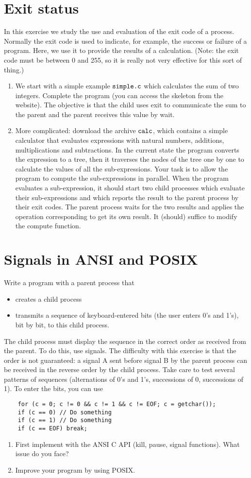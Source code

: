 \documentclass[11pt]{article}
\begin{document}
\bigskip


\section{Exit status}

In this exercise we study the use and evaluation of the exit code of a process. Normally the exit code is used to indicate, for example, the success or failure of a program. Here, we use it to provide the results of a calculation. (Note: the exit code must be between 0 and 255, so it is really not very effective for this sort of thing.)
\begin{enumerate}
	\item We start with a simple example $\verb|simple.c|$ which calculates the sum of two integers. Complete the program (you can access the skeleton from the website). The objective is that the child uses exit to communicate the sum to the parent and the parent receives this value by wait.
	
	\item More complicated: download the archive $\verb*|calc|$, which contains a simple calculator that evaluates expressions with natural numbers, additions, multiplications and subtractions. In the current state the program converts the expression to a tree, then it traverses the nodes of the tree one by one to calculate the values of all the sub-expressions. Your task is to allow the program to compute the sub-expressions in parallel. When the program evaluates a sub-expression, it should start two child processes which evaluate their sub-expressions and which reports the result to the parent process by their exit codes. The parent process waits for the two results and applies the operation corresponding to get its own result. It (should) suffice to modify the compute function.
\end{enumerate}


\section{Signals in ANSI and POSIX}
 Write a program with a parent process that \begin{itemize}
 	\item creates a child process
 	\item transmits a sequence of keyboard-entered bits (the user enters 0's and 1's), bit by bit, to this child process.
 \end{itemize}
The child process must display the sequence in the correct order as received from the parent. To do this, use signals. The difficulty with this exercise is that the order is not guaranteed: a signal A sent before signal B by the parent process can be received in the reverse order by the child process.
Take care to test several patterns of sequences (alternations of 0's and 1's, successions of 0, successions of 1).
To enter the bits, you can use 
\begin{verbatim}
	for (c = 0; c != 0 && c != 1 && c != EOF; c = getchar());
	if (c == 0) // Do something
	if (c == 1) // Do something
	if (c == EOF) break;
\end{verbatim}

\begin{enumerate}
	\item  First implement with the ANSI C API (kill, pause, signal functions). What issue do you face?
	\item Improve your program by using POSIX.
\end{enumerate}
\end{document}
